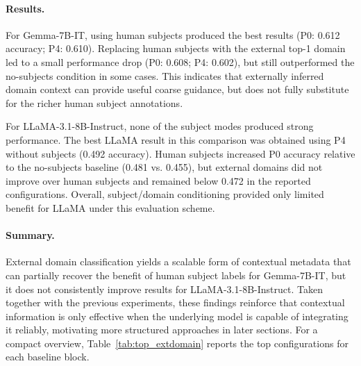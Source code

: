 \paragraph{Results.}
For Gemma-7B-IT, using human subjects produced the best results (P0: 0.612 accuracy; P4: 0.610). Replacing human subjects with the external top-1 domain led to a small performance drop (P0: 0.608; P4: 0.602), but still outperformed the no-subjects condition in some cases. This indicates that externally inferred domain context can provide useful coarse guidance, but does not fully substitute for the richer human subject annotations.

For LLaMA-3.1-8B-Instruct, none of the subject modes produced strong performance. The best LLaMA result in this comparison was obtained using P4 without subjects (0.492 accuracy). Human subjects increased P0 accuracy relative to the no-subjects baseline (0.481 vs. 0.455), but external domains did not improve over human subjects and remained below 0.472 in the reported configurations. Overall, subject/domain conditioning provided only limited benefit for LLaMA under this evaluation scheme.

\paragraph{Summary.}
External domain classification yields a scalable form of contextual metadata that can partially recover the benefit of human subject labels for Gemma-7B-IT, but it does not consistently improve results for LLaMA-3.1-8B-Instruct. Taken together with the previous experiments, these findings reinforce that contextual information is only effective when the underlying model is capable of integrating it reliably, motivating more structured approaches in later sections. For a compact overview, Table~\ref{tab:top_extdomain} reports the top configurations for each baseline block.

